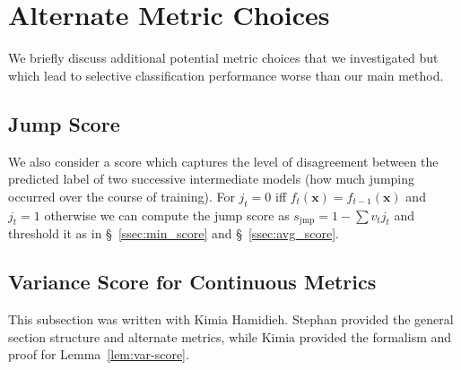 \section{Alternate Metric Choices}
\label{sec:alt_scores}

We briefly discuss additional potential metric choices that we investigated but which lead to selective classification performance worse than our main method.


\subsection{Jump Score \sjmp} We also consider a score which captures the level of disagreement between the predicted label of two successive intermediate models (\ie how much jumping occurred over the course of training). For $j_t = 0$ iff $f_{t}(\bm{x}) = f_{t-1}(\bm{x})$ and $j_t = 1$ otherwise we can compute the jump score as $s_\text{jmp} = 1 - \sum v_t j_t$ and threshold it as in \S~\ref{ssec:min_score} and \S~\ref{ssec:avg_score}. 

\subsection{Variance Score \svar for Continuous Metrics}

\begin{contriback}
This subsection was written with Kimia Hamidieh. Stephan provided the general section structure and alternate metrics, while Kimia provided the formalism and proof for Lemma~\ref{lem:var-score}.
\end{contriback}

